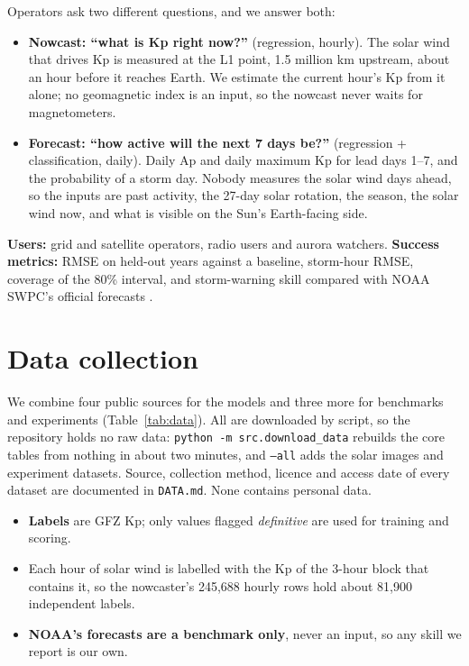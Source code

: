 \documentclass[conference,a4paper]{IEEEtran}
\newcommand{\code}[1]{\texttt{\footnotesize #1}}
\begin{document}
Operators ask two different questions, and we answer both:
\begin{itemize}
\item \textbf{Nowcast: ``what is Kp right now?''} (regression, hourly). The solar wind that drives Kp is measured at
the L1 point, 1.5 million km upstream, about an hour before it reaches Earth. We estimate the current hour's Kp from
it alone; no geomagnetic index is an input, so the nowcast never waits for magnetometers.
\item \textbf{Forecast: ``how active will the next 7 days be?''} (regression + classification, daily). Daily Ap and
daily maximum Kp for lead days 1--7, and the probability of a storm day. Nobody measures the solar wind days ahead,
so the inputs are past activity, the 27-day solar rotation, the season, the solar wind now, and what is visible on
the Sun's Earth-facing side.
\end{itemize}
\textbf{Users:} grid and satellite operators, radio users and aurora watchers. \textbf{Success metrics:} RMSE on
held-out years against a baseline, storm-hour RMSE, coverage of the 80\% interval, and storm-warning skill compared
with NOAA SWPC's official forecasts \cite{swpc}.

\section{Data collection}
We combine four public sources for the models and three more for benchmarks and experiments
(Table~\ref{tab:data}). All are downloaded by script, so the repository holds no raw data:
\code{python -m src.download\_data} rebuilds the core tables from nothing in about two minutes, and
\code{--all} adds the solar images and experiment datasets. Source, collection method, licence and access date of
every dataset are documented in \code{DATA.md}. None contains personal data.
\begin{itemize}
\item \textbf{Labels} are GFZ Kp; only values flagged \emph{definitive} are used for training and scoring.
\item Each hour of solar wind is labelled with the Kp of the 3-hour block that contains it, so the nowcaster's
245{,}688 hourly rows hold about 81{,}900 independent labels.
\item \textbf{NOAA's forecasts are a benchmark only}, never an input, so any skill we report is our own.
\end{itemize}
\end{document}
